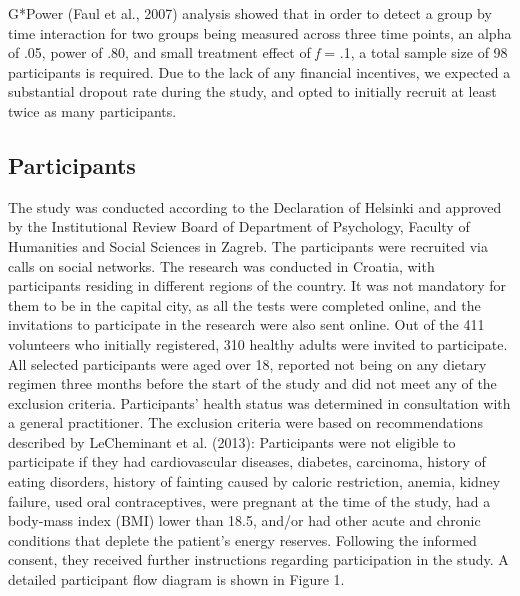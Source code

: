 \documentclass[authordate, empirical,issue]{jote-new-article}
\begin{document}
G*Power (Faul et al., 2007) analysis showed that in order to detect a group by time interaction for two groups being measured across three time points, an alpha of .05, power of .80, and small treatment effect of \emph{f }= .1, a total sample size of 98 participants is required. Due to the lack of any financial incentives, we expected a substantial dropout rate during the study, and opted to initially recruit at least twice as many participants.



\subsection{Participants}



The study was conducted according to the Declaration of Helsinki and approved by the Institutional Review Board of Department of Psychology, Faculty of Humanities and Social Sciences in Zagreb. The participants were recruited via calls on social networks. The research was conducted in Croatia, with participants residing in different regions of the country. It was not mandatory for them to be in the capital city, as all the tests were completed online, and the invitations to participate in the research were also sent online. Out of the 411 volunteers who initially registered, 310 healthy adults were invited to participate. All selected participants were aged over 18, reported not being on any dietary regimen three months before the start of the study and did not meet any of the exclusion criteria. Participants' health status was determined in consultation with a general practitioner. The exclusion criteria were based on recommendations described by LeCheminant et al. (2013): Participants were not eligible to participate if they had cardiovascular diseases, diabetes, carcinoma, history of eating disorders, history of fainting caused by caloric restriction, anemia, kidney failure, used oral contraceptives, were pregnant at the time of the study, had a body-mass index (BMI) lower than 18.5, and/or had other acute and chronic conditions that deplete the patient's energy reserves. Following the informed consent, they received further instructions regarding participation in the study. A detailed participant flow diagram is shown in Figure 1.
\end{document}

